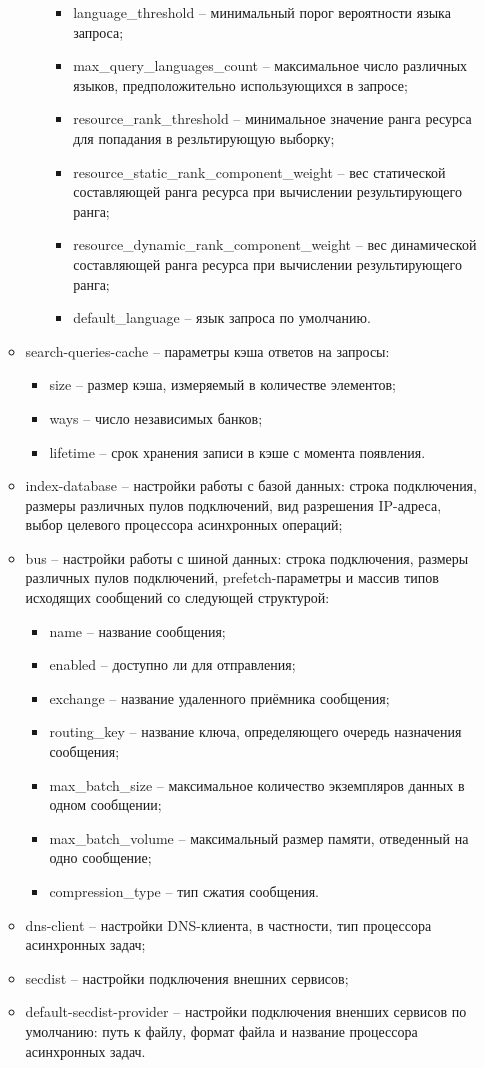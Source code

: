 \begin{itemize}
\begin{itemize}
\begin{itemize}
\begin{itemize}
\item language\_threshold -- минимальный порог вероятности языка запроса;
\item max\_query\_languages\_count -- максимальное число различных языков, предположительно использующихся в запросе;
\item resource\_rank\_threshold -- минимальное значение ранга ресурса для попадания в резльтирующую выборку;
\item resource\_static\_rank\_component\_weight -- вес статической составляющей ранга ресурса при вычислении результирующего ранга;
\item resource\_dynamic\_rank\_component\_weight -- вес динамической составляющей ранга ресурса при вычислении результирующего ранга;
\item default\_language -- язык запроса по умолчанию.
\end{itemize}
\end{itemize}
\item search-queries-cache -- параметры кэша ответов на запросы:
\begin{itemize}
\item size -- размер кэша, измеряемый в количестве элементов;
\item ways -- число независимых банков;
\item lifetime -- срок хранения записи в кэше с момента появления.
\end{itemize}
\item index-database -- настройки работы с базой данных:  строка подключения, размеры различных пулов подключений, вид разрешения IP-адреса, выбор целевого процессора асинхронных операций;
\item bus -- настройки работы с шиной данных: строка подключения, размеры различных пулов подключений, prefetch-параметры и массив типов исходящих сообщений со следующей структурой:
\begin{itemize}
\item name -- название сообщения;
\item enabled -- доступно ли для отправления;
\item exchange -- название удаленного приёмника сообщения;
\item routing\_key -- название ключа, определяющего очередь назначения сообщения;
\item max\_batch\_size -- максимальное количество экземпляров данных в одном сообщении;
\item max\_batch\_volume -- максимальный размер памяти, отведенный на одно сообщение;
\item compression\_type -- тип сжатия сообщения.
\end{itemize}
\item dns-client -- настройки DNS-клиента, в частности, тип процессора асинхронных задач;
\item secdist -- настройки подключения внешних сервисов;
\item default-secdist-provider -- настройки подключения вненших сервисов по умолчанию: путь к файлу, формат файла и название процессора асинхронных задач.
\end{itemize}
\end{itemize}

